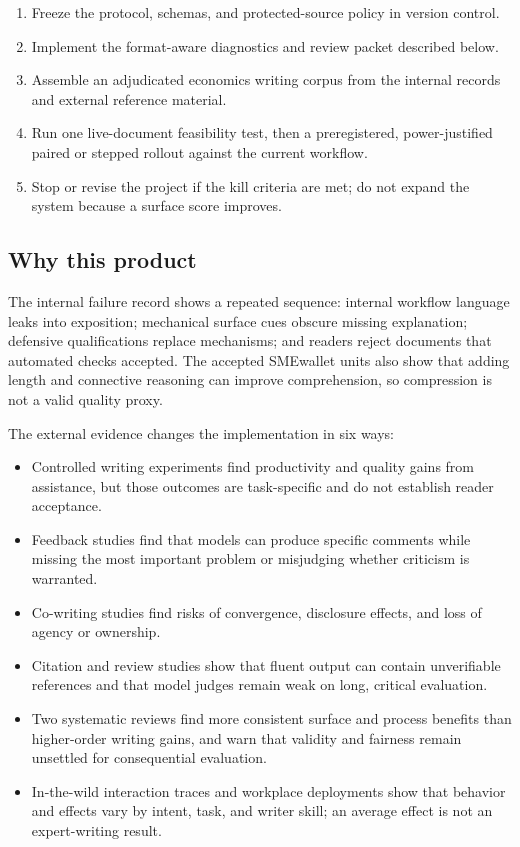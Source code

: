 \documentclass[11pt]{article}
\providecommand{\tightlist}{\setlength{\itemsep}{0pt}\setlength{\parskip}{0pt}}
\begin{document}
\begin{enumerate}
\def\labelenumi{\arabic{enumi}.}
\tightlist
\item
  Freeze the protocol, schemas, and protected-source policy in version control.
\item
  Implement the format-aware diagnostics and review packet described below.
\item
  Assemble an adjudicated economics writing corpus from the internal records and external reference material.
\item
  Run one live-document feasibility test, then a preregistered, power-justified paired or stepped rollout against the current workflow.
\item
  Stop or revise the project if the kill criteria are met; do not expand the system because a surface score improves.
\end{enumerate}

\hypertarget{why-this-product}{%
\subsection{Why this product}\label{why-this-product}}

The internal failure record shows a repeated sequence: internal workflow language leaks into exposition; mechanical surface cues obscure missing explanation; defensive qualifications replace mechanisms; and readers reject documents that automated checks accepted. The accepted SMEwallet units also show that adding length and connective reasoning can improve comprehension, so compression is not a valid quality proxy.

The external evidence changes the implementation in six ways:

\begin{itemize}
\tightlist
\item
  Controlled writing experiments find productivity and quality gains from assistance, but those outcomes are task-specific and do not establish reader acceptance.
\item
  Feedback studies find that models can produce specific comments while missing the most important problem or misjudging whether criticism is warranted.
\item
  Co-writing studies find risks of convergence, disclosure effects, and loss of agency or ownership.
\item
  Citation and review studies show that fluent output can contain unverifiable references and that model judges remain weak on long, critical evaluation.
\item
  Two systematic reviews find more consistent surface and process benefits than higher-order writing gains, and warn that validity and fairness remain unsettled for consequential evaluation.
\item
  In-the-wild interaction traces and workplace deployments show that behavior and effects vary by intent, task, and writer skill; an average effect is not an expert-writing result.
\end{itemize}
\end{document}
